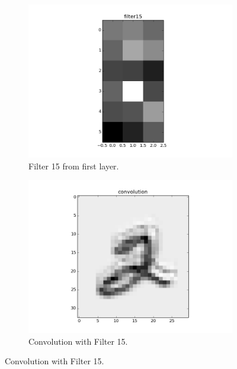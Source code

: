 \documentclass{article}
\begin{document}
\begin{figure}[h]
	\centering
	\begin{subfigure}[b]{0.45\textwidth} 
		\includegraphics[width=\textwidth]{graphics/aniso1.png}
		\caption{Filter 15 from first layer.}
		\label{fig13}
	\end{subfigure}
	\begin{subfigure}[b]{0.45\textwidth} 
		\includegraphics[width=\textwidth]{graphics/conv_aniso1.png}
		\caption{Convolution with Filter 15.}
		\label{fig14}
	\end{subfigure}
\end{figure}
\end{document}
